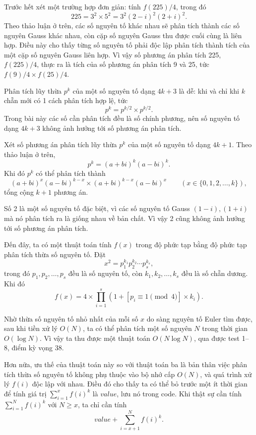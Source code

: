 \documentclass[11pt]{article}
\begin{document}
Trước hết xét một trường hợp đơn giản: tính \(f(225)/4\), trong đó
\[
  225=3^2\times5^2=3^2(2-i)^2(2+i)^2.
\]
Theo thảo luận ở trên, các số nguyên tố khác nhau sẽ phân tích thành các số
nguyên Gauss khác nhau, còn cặp số nguyên Gauss thu được cuối cùng là liên
hợp. Điều này cho thấy từng số nguyên tố phải độc lập phân tích thành tích
của một cặp số nguyên Gauss liên hợp. Vì vậy số phương án phân tích 225,
\(f(225)/4\), thực ra là tích của số phương án phân tích 9 và 25, tức
\(f(9)/4\times f(25)/4\).

Phân tích lũy thừa \(p^k\) của một số nguyên tố dạng \(4k+3\) là dễ: khi và
chỉ khi \(k\) chẵn mới có 1 cách phân tích hợp lệ, tức
\[
  p^k=p^{k/2}\times p^{k/2}.
\]
Trong bài này các số cần phân tích đều là số chính phương, nên số nguyên tố
dạng \(4k+3\) không ảnh hưởng tới số phương án phân tích.

Xét số phương án phân tích lũy thừa \(p^k\) của một số nguyên tố dạng
\(4k+1\). Theo thảo luận ở trên,
\[
  p^k=(a+bi)^k(a-bi)^k.
\]
Khi đó \(p^k\) có thể phân tích thành
\[
  (a+bi)^x(a-bi)^{k-x}\times (a+bi)^{k-x}(a-bi)^x
  \qquad (x\in\{0,1,2,\ldots,k\}),
\]
tổng cộng \(k+1\) phương án.

Số 2 là một số nguyên tố đặc biệt, vì các số nguyên tố Gauss
\((1-i),(1+i)\) mà nó phân tích ra là giống nhau về bản chất. Vì vậy 2 cũng
không ảnh hưởng tới số phương án phân tích.

Đến đây, ta có một thuật toán tính \(f(x)\) trong độ phức tạp bằng độ phức tạp
phân tích thừa số nguyên tố. Đặt
\[
  x^2=p_1^{k_1}p_2^{k_2}\cdots p_s^{k_s},
\]
trong đó \(p_1,p_2,\ldots,p_s\) đều là số nguyên tố, còn
\(k_1,k_2,\ldots,k_s\) đều là số chẵn dương. Khi đó
\[
  f(x)=4\times\prod_{i=1}^{s}\left(1+[p_i\equiv1\pmod4]\times k_i\right).
\]

Nhờ thừa số nguyên tố nhỏ nhất của mỗi số \(x\) do sàng nguyên tố Euler tìm
được, sau khi tiền xử lý \(O(N)\), ta có thể phân tích một số nguyên \(N\)
trong thời gian \(O(\log N)\). Vì vậy ta thu được một thuật toán
\(O(N\log N)\), qua được test 1--8, điểm kỳ vọng 38.

Hơn nữa, ưu thế của thuật toán này so với thuật toán ba là bản thân việc phân
tích thừa số nguyên tố không phụ thuộc vào bộ nhớ cấp \(O(N)\), và quá trình
xử lý \(f(i)\) độc lập với nhau. Điều đó cho thấy ta có thể bỏ trước một ít
thời gian để tính giá trị \(\sum_{i=1}^{x} f(i)^k\) là \(value\), lưu nó trong
code. Khi thật sự cần tính \(\sum_{i=1}^{N} f(i)^k\) với \(N\ge x\), ta chỉ
cần tính
\[
  value+\sum_{i=x+1}^{N} f(i)^k.
\]
\end{document}

